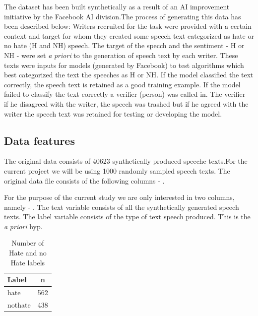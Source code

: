 \documentclass[
  english,
  man]{apa6}
\begin{document}
The dataset has been built synthetically as a result of an AI improvement initiative by the Facebook AI division.The process of generating this data has been described below:
Writers recruited for the task were provided with a certain context and target for whom they created some speech text categorized as hate or no hate (H and NH) speech. The target of the specch and the sentiment - H or NH - were set \emph{a} \emph{priori} to the generation of speech text by each writer. These texts were inputs for models (generated by Facebook) to test algorithms which best categorized the text the speeches as H or NH. If the model classified the text correctly, the speech text is retained as a good training example. If the model failed to classify the text correctly a verifier (person) was called in. The verifier - if he disagreed with the writer, the speech was trashed but if he agreed with the writer the speech text was retained for testing or developing the model.

\hypertarget{data-features}{%
\subsection{Data features}\label{data-features}}

The original data consists of 40623 synthetically produced speeche texts.For the current project we will be using 1000 randomly sampled speech texts. The original data file consists of the following columns - .

For the purpose of the current study we are only interested in two columns, namely - . The text variable consists of all the synthetically generated speech texts. The label variable consists of the type of text speech produced. This is the \emph{a} \emph{priori} hyp.

\begin{table}[tbp]

\begin{center}
\begin{threeparttable}

\caption{\label{tab:describe-table}Number of Hate and no Hate labels}

\begin{tabular}{ll}
\toprule
Label & \multicolumn{1}{c}{n}\\
\midrule
hate & 562\\
nothate & 438\\
\bottomrule
\end{tabular}

\end{threeparttable}
\end{center}

\end{table}
\end{document}
